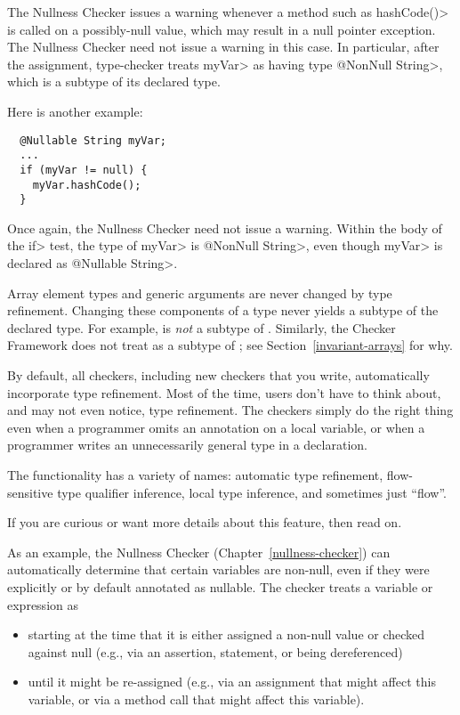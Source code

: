 \noindent
The Nullness Checker issues a warning whenever a method such as
\<hashCode()> is called on a possibly-null value, which  may result in a 
null pointer exception.  The Nullness Checker need not issue a warning in
this case.  In particular, after the assignment, type-checker
treats \<myVar> as having type \<@NonNull String>, which is a subtype of its
declared type.

Here is another example:

\begin{Verbatim}
  @Nullable String myVar;
  ...
  if (myVar != null) {
    myVar.hashCode();
  }
\end{Verbatim}

\noindent
Once again, the Nullness Checker need not issue a warning.  Within the body
of the \<if> test, the type of \<myVar> is \<@NonNull String>, even though
\<myVar> is declared as \<@Nullable String>.


Array element types and generic arguments are never changed by type
refinement.  Changing these components of a type never yields a subtype of
the declared type.  For example,  is \emph{not} a
subtype of .  Similarly, the Checker Framework does not
treat  as a subtype of
; see Section~\ref{invariant-arrays} for why.



By default, all checkers, including new checkers that you write,
automatically incorporate type refinement.  Most of the time, users don't
have to think about, and may not even notice, type refinement.  The
checkers simply do the right thing even when a programmer omits an
annotation on a local variable, or when a programmer writes an
unnecessarily general type in a declaration.

The functionality has a variety of names:  automatic type refinement,
flow-sensitive type qualifier inference, local type inference, and
sometimes just ``flow''.

If you are curious or want more details about this feature, then read on.

As an example, the Nullness Checker (Chapter~\ref{nullness-checker}) can automatically
determine that certain variables are non-null, even if they were explicitly
or by default annotated as nullable.
The checker treats a variable or expression as 
\begin{itemize}
\item
starting at the time that it is either
assigned a non-null value or checked against null (e.g., via an assertion,
 statement, or being dereferenced)
\item
until it might be re-assigned (e.g.,
via an assignment that might affect this variable, or via a method call
that might affect this variable).
\end{itemize}

